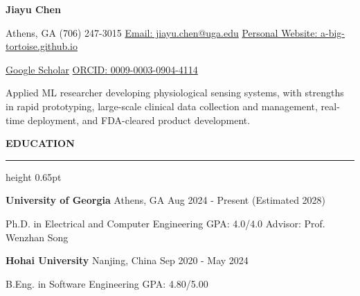 \documentclass[10pt,letterpaper]{article}
\newcommand{\sectiontitle}[1]{%
  \vspace{0.72em}%
  {\fontsize{12}{13.3}\selectfont\bfseries\color{accent}\MakeUppercase{#1}}\par
  \vspace{0.16em}%
  {\color{accent}\hrule height 0.65pt}%
  \vspace{0.38em}%
}
\newcommand{\entryhead}[1]{%
  {\fontsize{10.25}{11.75}\selectfont #1}\par
  \vspace{0.12em}%
}
\begin{document}
\begin{center}
  {\fontsize{23}{24}\selectfont\bfseries\color{accent} Jiayu Chen}\par
  \vspace{0.22em}
  {\fontsize{9.35}{10.7}\selectfont
    Athens, GA \textbar{} (706) 247-3015 \textbar{}
    \href{mailto:jiayu.chen@uga.edu}{Email: jiayu.chen@uga.edu} \textbar{}
    \href{https://a-big-tortoise.github.io}{Personal Website: a-big-tortoise.github.io}
  }\par
  \vspace{0.12em}
  {\fontsize{9.35}{10.7}\selectfont
    \href{https://scholar.google.com/citations?user=RgvEBMkAAAAJ}{Google Scholar} \textbar{}
    \href{https://orcid.org/0009-0003-0904-4114}{ORCID: 0009-0003-0904-4114}
  }\par
  \vspace{0.36em}
  {\fontsize{10.1}{11.7}\selectfont
    Applied ML researcher developing physiological sensing systems, with strengths in rapid prototyping,
    large-scale clinical data collection and management, real-time deployment, and FDA-cleared product development.
  }\par
\end{center}
\vspace{-0.20em}

\sectiontitle{Education}
\entryhead{\textbf{University of Georgia} \textbar{} Athens, GA \textbar{} Aug 2024 - Present (Estimated 2028)}
\entryhead{Ph.D. in Electrical and Computer Engineering \textbar{} GPA: 4.0/4.0 \textbar{} Advisor: Prof. Wenzhan Song}
\vspace{0.18em}
\entryhead{\textbf{Hohai University} \textbar{} Nanjing, China \textbar{} Sep 2020 - May 2024}
\entryhead{B.Eng. in Software Engineering \textbar{} GPA: 4.80/5.00}
\end{document}
